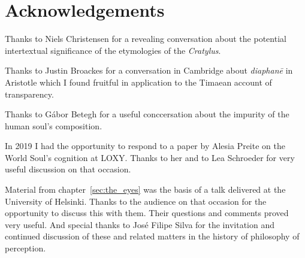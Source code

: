 \chapter*{Acknowledgements} %
\label{cha:acknowledgements}

Thanks to Niels Christensen for a revealing conversation about the potential intertextual significance of the etymologies of the \emph{Cratylus}.

Thanks to Justin Broackes for a conversation in Cambridge about \emph{diaphanē} in Aristotle which I found fruitful in application to the Timaean account of transparency.

Thanks to Gábor Betegh for a useful conccersation about the impurity of the human soul's composition.

In 2019 I had the opportunity to respond to a paper by Alesia Preite on the World Soul's cognition at LOXY. Thanks to her and to Lea Schroeder for very useful discussion on that occasion.

Material from chapter~\ref{sec:the_eyes} was the basis of a talk delivered at the University of Helsinki. Thanks to the audience on that occasion for the opportunity to discuss this with them. Their questions and comments proved very useful. And special thanks to Jos\'{e} Filipe Silva for the invitation and continued discussion of these and related matters in the history of philosophy of perception.

